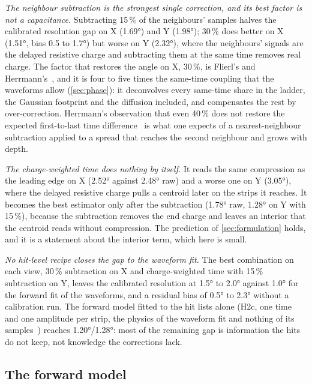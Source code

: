 \emph{The neighbour subtraction is the strongest single correction, and its best factor is not a capacitance.} Subtracting
15\,\% of the neighbours' samples halves the calibrated resolution gap on X (\ang{1.69}) and Y (\ang{1.98}); 30\,\% does better on X
(\ang{1.51}, bias 0.5 to \ang{1.7}) but worse on Y (\ang{2.32}), where the neighbours' signals are the delayed resistive charge and
subtracting them at the same time removes real charge. The factor that restores the angle on X, 30\,\%, is Flierl's and
Herrmann's~\cite{Flierl2018,Herrmann2019}, and it is four to five times the same-time coupling that the waveforms allow
(\cref{sec:phase}): it deconvolves every same-time share in the ladder, the Gaussian footprint and the diffusion included, and
compensates the rest by over-correction. Herrmann's observation that even 40\,\% does not restore the expected first-to-last
time difference~\cite{Herrmann2019} is what one expects of a nearest-neighbour subtraction applied to a spread that reaches the
second neighbour and grows with depth.

\emph{The charge-weighted time does nothing by itself.} It reads the same compression as the leading edge on X (\ang{2.52} against
\ang{2.48} raw) and a worse one on Y (\ang{3.05}), where the delayed resistive charge pulls a centroid later on the strips it
reaches. It becomes the best estimator only after the subtraction (\ang{1.78} raw, \ang{1.28} on Y with 15\,\%), because the
subtraction removes the end charge and leaves an interior that the centroid reads without compression. The prediction of
\cref{sec:formulation} holds, and it is a statement about the interior term, which here is small.

\emph{No hit-level recipe closes the gap to the waveform fit.} The best combination on each view, 30\,\% subtraction on X and
charge-weighted time with 15\,\% subtraction on Y, leaves the calibrated resolution at \ang{1.5} to \ang{2.0} against \ang{1.0} for the
forward fit of the waveforms, and a residual bias of \ang{0.5} to \ang{2.3} without a calibration run. The forward model fitted
to the hit lists alone (H2c, one time and one amplitude per strip, the physics of the waveform fit and nothing of its
samples~\cite{paperII}) reaches \ang{1.20}/\ang{1.28}: most of the remaining gap is information the hits do not keep, not
knowledge the corrections lack.

\subsection{The forward model}\label{sec:forward}

